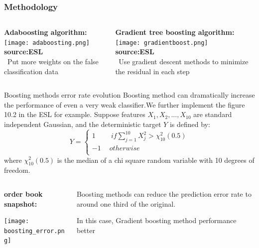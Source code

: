 \documentclass[xcolor={x11names,svgnames,dvipsnames}]{beamer}
\begin{document}
\begin{frame}
	\frametitle{Methodology}
\begin{columns}

	\begin{column}{.5\textwidth}
		\textbf{Adaboosting algorithm:}\\
		\texttt{[image: adaboosting.png]}\\
		\small{\textbf{source:ESL}}\\
		\alert{\textbullet\ Put more weights on the false classification data}
	\end{column}
	\begin{column}{.5\textwidth}
		\textbf{Gradient tree boosting algorithm:}\\
		\texttt{[image: gradientboost.png]}\\
	    \small{\textbf{source:ESL}}\\
	    \alert{\textbullet\ Use gradient descent methods to minimize the residual in each step}
	\end{column}
\end{columns}	
\end{frame}

\begin{frame}
	\begin{block}{Boosting methods error rate evolution}
		\footnotesize{
      Boosting method can dramatically increase the performance of even a very weak classifier.We further implement the figure 10.2 in the ESL for example. Suppose features $X_1, X_2,...,X_10$ are standard independent Gaussian, and the deterministic target $Y$ is defined by:\\
      \begin{equation*}
       Y=\left\{
       \begin{array}{l}
       1\ \quad\quad if \sum_{j=1}^{10}X_j^2>\chi_{10}^2(0.5) \\
       -1\ \quad otherwise\\
       \end{array}
       \right.    
      \end{equation*} 
    where $\chi_{10}^2(0.5)$ is the median of a chi square random variable with 10 degrees of freedom.}
	\end{block}
	\begin{columns}		
		\begin{column}{.6\textwidth}
		\textbf{order book snapshot:}
			\begin{center}
						\texttt{[image: boosting\_error.png]}
			\end{center}
		\end{column}
		\begin{column}{.4\textwidth}
			\begin{itemize}
				\small{
			\item Boosting methods can reduce the prediction error rate to around one third of the original.
			\item In this case, Gradient boosting method performance better}
			\end{itemize}
		\end{column}
	\end{columns}	
\end{frame}
\end{document}
